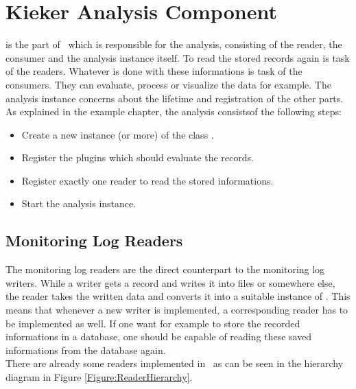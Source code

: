 \chapter{Kieker Analysis Component}
	
	\class{\KiekerAnalysisPart} is the part of \Kieker\  which is responsible for the analysis, consisting of the reader, the consumer and the analysis instance itself. To read the stored records again is task of the readers. Whatever is done with these informations is task of the consumers. They can evaluate, process or visualize the data for example. The analysis instance concerns about the lifetime and registration of the other parts. As explained in the example chapter, the analysis consists\notify  of the following steps:
	\begin{itemize}
		\item Create a new instance (or more) of the class .
		\item Register the plugins which should evaluate the records.
		\item Register exactly one reader to read the stored informations.
		\item Start the analysis instance.
	\end{itemize}

	\section{Monitoring Log Readers}

		The monitoring log readers are the direct counterpart to the monitoring log writers. While a writer gets a record and writes it into files or somewhere else, the reader takes the written data and converts it into a suitable instance of . \warning This means that whenever a new writer is implemented, a corresponding reader has to be implemented as well. If one want for example to store the recorded informations in a database, one should be capable of reading these saved informations from the database again.\\
		There are already some readers implemented in \Kieker\  as can be seen in the hierarchy diagram in Figure \ref{Figure:ReaderHierarchy}.

